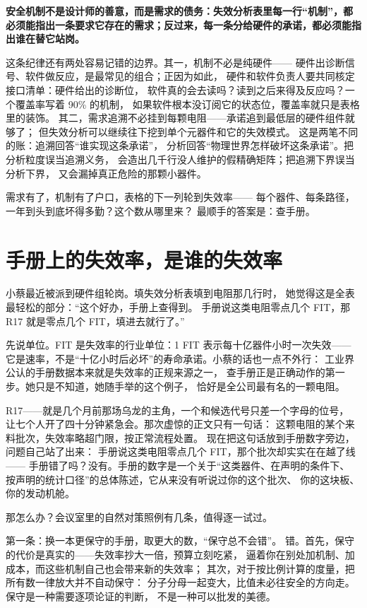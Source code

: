 \textbf{安全机制不是设计师的善意，而是需求的债务：失效分析表里每一行“机制”，都必须能指出一条要求它存在的需求；反过来，每一条分给硬件的承诺，都必须能指出谁在替它站岗。}

这条纪律还有两处容易记错的边界。其一，机制不必是纯硬件——
硬件出诊断信号、软件做反应，是最常见的组合；正因为如此，
硬件和软件负责人要共同核定接口清单：硬件给出的诊断位，
软件真的会去读吗？读到之后来得及反应吗？一个覆盖率写着 90\% 的机制，
如果软件根本没订阅它的状态位，覆盖率就只是表格里的装饰。
其二，需求追溯不必挂到每颗电阻——承诺追到最低层的硬件组件就够了；
但失效分析可以继续往下挖到单个元器件和它的失效模式。
这是两笔不同的账：追溯回答“谁实现这条承诺”，
分析回答“物理世界怎样破坏这条承诺”。把分析粒度误当追溯义务，
会造出几千行没人维护的假精确矩阵；把追溯下界误当分析下界，
又会漏掉真正危险的那颗小器件。

需求有了，机制有了户口，表格的下一列轮到失效率——
每个器件、每条路径，一年到头到底坏得多勤？这个数从哪里来？
最顺手的答案是：查手册。

\section{手册上的失效率，是谁的失效率}

小蔡最近被派到硬件组轮岗。填失效分析表填到电阻那几行时，
她觉得这是全表最轻松的部分：“这个好办，手册上查得到。
手册说这类电阻零点几个 FIT，那 R17 就是零点几个 FIT，填进去就行了。”

先说单位。FIT 是失效率的行业单位：1 FIT 表示每十亿器件小时一次失效——
它是速率，不是“十亿小时后必坏”的寿命承诺。小蔡的话也一点不外行：
工业界公认的手册数据本来就是失效率的正规来源之一，
查手册正是正确动作的第一步。她只是不知道，她随手举的这个例子，
恰好是全公司最有名的一颗电阻。

R17——就是几个月前那场乌龙的主角，一个和候选代号只差一个字母的位号，
让七个人开了四十分钟紧急会。那次虚惊的正文只有一句话：
这颗电阻的某个来料批次，失效率略超门限，按正常流程处置。
现在把这句话放到手册数字旁边，问题自己站了出来：
手册说这类电阻零点几个 FIT，那个批次却实实在在越了线——
手册错了吗？没有。手册的数字是一个关于“这类器件、在声明的条件下、
按声明的统计口径”的总体陈述，它从来没有听说过你的这个批次、
你的这块板、你的发动机舱。

那怎么办？会议室里的自然对策照例有几条，值得逐一试过。

第一条：换一本更保守的手册，取更大的数，“保守总不会错”。
错。首先，保守的代价是真实的——失效率抄大一倍，预算立刻吃紧，
逼着你在别处加机制、加成本，而这些机制自己也会带来新的失效率；
其次，对于按比例计算的度量，把所有数一律放大并不自动保守：
分子分母一起变大，比值未必往安全的方向走。保守是一种需要逐项论证的判断，
不是一种可以批发的美德。

